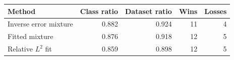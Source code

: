 \begin{tabular}{lrrrr}
\toprule
Method & Class ratio & Dataset ratio & Wins & Losses \\
\midrule
Inverse error mixture & 0.882 & 0.924 & 11 & 4 \\
Fitted mixture & 0.876 & 0.918 & 12 & 5 \\
Relative $L^2$ fit & 0.859 & 0.898 & 12 & 5 \\
\bottomrule
\end{tabular}

